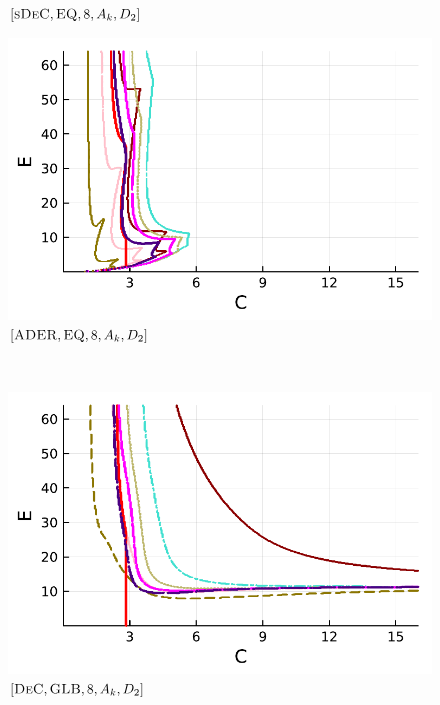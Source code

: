 \begin{figure}[!h]
\begin{minipage}[t]{0.32\textwidth}
		\centering
		$[\textsc{sDeC},\textsc{EQ},8, A_k,D_2]$
	\end{minipage}
	\begin{minipage}[t]{0.32\textwidth}
		\includegraphics[width=\textwidth]{pdf/pdepics/diff/IMEXADER_equispaced_adv_ord_1-8.pdf}
		\centering
		$[\textsc{ADER},\textsc{EQ},8, A_k,D_2]$
	\end{minipage}\\
	\begin{minipage}[t]{0.32\textwidth}
		\includegraphics[width=\textwidth]{pdf/pdepics/diff/IMEXDeC_gaussLobatto_adv_ord_1-8.pdf}
		\centering
		$[\textsc{DeC},\textsc{GLB},8, A_k,D_2]$
	\end{minipage}
	\begin{minipage}[t]{0.32\textwidth}

\end{minipage}
\end{figure}
